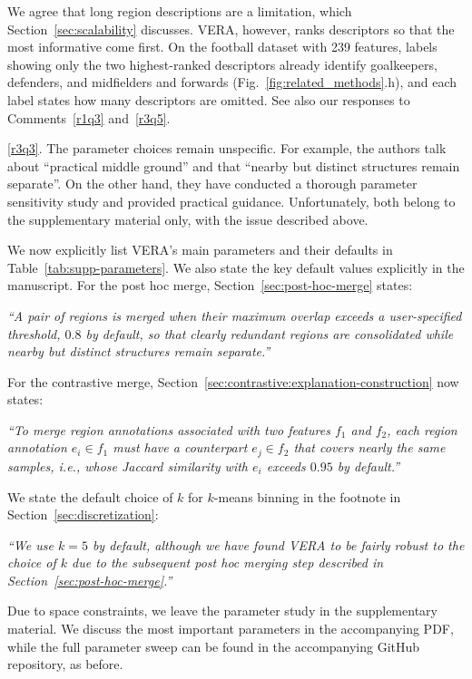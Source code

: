\documentclass[11pt]{article}
\newcounter{rtaskno}
\newcommand{\rtask}[1]{\refstepcounter{rtaskno}\label{#1}}
\newcommand{\reviewc}[2]{\begin{leftbar}\noindent\rtask{#1}\ref{#1}. #2\end{leftbar}\vspace*{-4mm}}
\newcommand{\answer}[1]{\noindent #1\par\vspace{2mm}}
\newcommand{\copyquote}[1]{\vspace{1mm} {\itshape ``#1''}\vspace{1mm}}
\newlength{\leftbarwidth}
\newlength{\leftbarsep}
\renewenvironment{leftbar}{%
    \def\FrameCommand{{\color{black}{\vrule width \leftbarwidth\relax\hspace {\leftbarsep}}}}%
    \MakeFramed {\advance \hsize -\width \FrameRestore }%
}{\endMakeFramed}
\begin{document}
\answer{%
We agree that long region descriptions are a limitation, which Section~\ref{sec:scalability} discusses. VERA, however, ranks descriptors so that the most informative come first. On the football dataset with 239 features, labels showing only the two highest-ranked descriptors already identify goalkeepers, defenders, and midfielders and forwards (Fig.~\ref{fig:related_methods}.h), and each label states how many descriptors are omitted. See also our responses to Comments~\ref{r1q3} and~\ref{r3q5}.
}

\reviewc{r3q3}{The parameter choices remain unspecific. For example, the authors talk about ``practical middle ground'' and that ``nearby but distinct structures remain separate''. On the other hand, they have conducted a thorough parameter sensitivity study and provided practical guidance. Unfortunately, both belong to the supplementary material only, with the issue described above.}

\answer{%
We now explicitly list VERA's main parameters and their defaults in Table~\ref{tab:supp-parameters}.
We also state the key default values explicitly in the manuscript. For the post hoc merge, Section~\ref{sec:post-hoc-merge} states:

\copyquote{A pair of regions is merged when their maximum overlap exceeds a user-specified threshold, $0.8$ by default, so that clearly redundant regions are consolidated while nearby but distinct structures remain separate.}

For the contrastive merge, Section~\ref{sec:contrastive:explanation-construction} now states:

\copyquote{To merge region annotations associated with two features $f_1$ and $f_2$, each region annotation $e_i \in f_1$ must have a counterpart $e_j \in f_2$ that covers nearly the same samples, i.e., whose Jaccard similarity with $e_i$ exceeds $0.95$ by default.}

We state the default choice of $k$ for $k$-means binning in the footnote in Section~\ref{sec:discretization}:

\copyquote{We use $k=5$ by default, although we have found VERA to be fairly robust to the choice of $k$ due to the subsequent post hoc merging step described in Section~\ref{sec:post-hoc-merge}.}

Due to space constraints, we leave the parameter study in the supplementary material. We discuss the most important parameters in the accompanying PDF, while the full parameter sweep can be found in the accompanying GitHub repository, as before.
}
\end{document}
